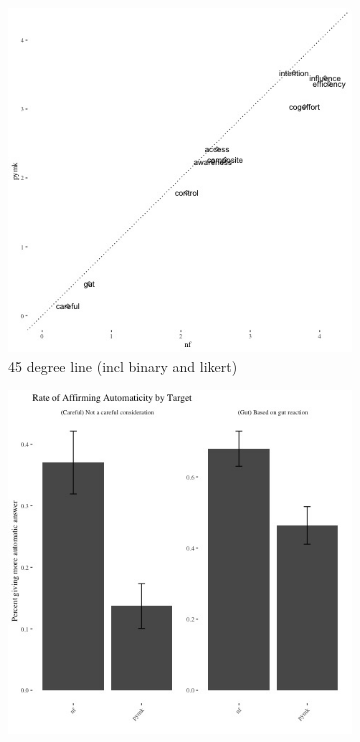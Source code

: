 \documentclass[12pt,letterpaper]{article}
\begin{document}
\begin{figure}
    \begin{subfigure}{.5\textwidth} 
        \centering
        \includegraphics[width=1\linewidth]{Output/Graphs/Experiments/Automaticity/45 degree scatter.jpg} 
        \caption{45 degree line (incl binary and likert)}
        \label{fig:sub-first}
    \end{subfigure}
    \begin{subfigure}{.5\textwidth} 
        \centering
        \includegraphics[width=1\linewidth]{Output/Graphs/Experiments/Automaticity/bar chart binary measures.jpg} 

\end{subfigure}
\end{figure}
\end{document}
